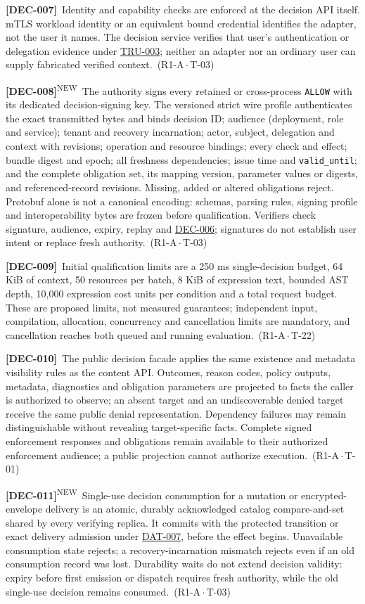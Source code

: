 \documentclass[11pt,a4paper]{article}
\newcommand{\code}[1]{{\small\nolinkurl{#1}}}
\newcommand{\rr}[1]{\hyperlink{req:#1}{#1}}
\newcommand{\reqtag}[2]{{\footnotesize\color{accent}(#1\,$\cdot$\,#2)}}
\newcommand{\req}[4]{\par\noindent\hypertarget{req:#1}{\textbf{[#1]}}\ #4\ \reqtag{#2}{#3}\par}
\newcommand{\reqn}[4]{\par\noindent\hypertarget{req:#1}{\textbf{[#1]}}\textsuperscript{\color{accent}\tiny NEW}\ #4\ \reqtag{#2}{#3}\par}
\begin{document}
\req{DEC-007}{R1-A}{T-03}{Identity and capability checks are enforced at the decision API itself. mTLS workload identity or an equivalent bound credential identifies the adapter, not the user it names. The decision service verifies that user's authentication or delegation evidence under \rr{TRU-003}; neither an adapter nor an ordinary user can supply fabricated verified context.}
\reqn{DEC-008}{R1-A}{T-03}{The authority signs every retained or cross-process \code{ALLOW} with its dedicated decision-signing key. The versioned strict wire profile authenticates the exact transmitted bytes and binds decision ID; audience (deployment, role and service); tenant and recovery incarnation; actor, subject, delegation and context with revisions; operation and resource bindings; every check and effect; bundle digest and epoch; all freshness dependencies; issue time and \code{valid_until}; and the complete obligation set, its mapping version, parameter values or digests, and referenced-record revisions. Missing, added or altered obligations reject. Protobuf alone is not a canonical encoding: schemas, parsing rules, signing profile and interoperability bytes are frozen before qualification. Verifiers check signature, audience, expiry, replay and \rr{DEC-006}; signatures do not establish user intent or replace fresh authority.}
\req{DEC-009}{R1-A}{T-22}{Initial qualification limits are a 250 ms single-decision budget, 64 KiB of context, 50 resources per batch, 8 KiB of expression text, bounded AST depth, 10,000 expression cost units per condition and a total request budget. These are proposed limits, not measured guarantees; independent input, compilation, allocation, concurrency and cancellation limits are mandatory, and cancellation reaches both queued and running evaluation.}
\req{DEC-010}{R1-A}{T-01}{The public decision facade applies the same existence and metadata visibility rules as the content API. Outcomes, reason codes, policy outputs, metadata, diagnostics and obligation parameters are projected to facts the caller is authorized to observe; an absent target and an undiscoverable denied target receive the same public denial representation. Dependency failures may remain distinguishable without revealing target-specific facts. Complete signed enforcement responses and obligations remain available to their authorized enforcement audience; a public projection cannot authorize execution.}
\reqn{DEC-011}{R1-A}{T-03}{Single-use decision consumption for a mutation or encrypted-envelope delivery is an atomic, durably acknowledged catalog compare-and-set shared by every verifying replica. It commits with the protected transition or exact delivery admission under \rr{DAT-007}, before the effect begins. Unavailable consumption state rejects; a recovery-incarnation mismatch rejects even if an old consumption record was lost. Durability waits do not extend decision validity: expiry before first emission or dispatch requires fresh authority, while the old single-use decision remains consumed.}
\end{document}
